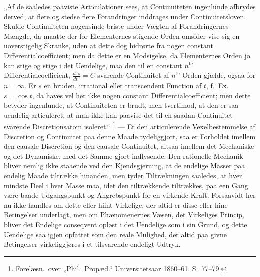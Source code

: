 \documentclass[12pt]{book}
\newcommand{\opage}[1]{\marginnote{\footnotesize\textit{[#1]}}}
\begin{document}
„Af de saaledes paaviste Articulationer sees, at Continuiteten ingenlunde afbrydes derved,
at flere og stedse flere Forandringer inddrages under Continuitetsloven. Skulde
Continuiteten nogensinde briste under Vægten af Forandringernes Mængde, da maatte der for
Elementernes stigende Orden omsider vise sig en uoverstigelig Skranke, uden at dette dog
hidrørte fra nogen constant Differentialcoefficient; men da dette er en Modsigelse, da
Elementernes Orden jo kan stige og stige i det Uendelige, maa den til en constant
$n^{\mathrm{te}}$ Differentialcoefficient, $\frac{d^{n}s}{dt^{n}} = C$ svarende Continuitet
af $n^{\mathrm{te}}$ Orden gjælde, ogsaa for $n = \infty$. Er $s$ en bruden, irrational
eller transcendent Function af $t$, f.\ Ex. $s = \cos t$, da haves vel her ikke nogen
constant Differentialcoefficient; men dette betyder ingenlunde, at Continuiteten er brudt,
men tvertimod, at den er saa uendelig articuleret, at man ikke kan paavise det til en saadan
Continuitet svarende Discretionsatom isoleret.“%
\footnote{Forelæsn.\ over „Phil.\ Propæd.“ Universitetsaar 1860--61. S.~77--79.}
--- Er den articulerende Vexelbestemmelse af Discretion og Continuitet paa denne Maade
tydeliggjort, saa er Forholdet imellem den causale Discretion og den causale Continuitet,
altsaa imellem det Mechaniske og det Dynamiske,
\opage{364} med det Samme gjort indlysende. Den rationelle Mechanik bliver nemlig ikke staaende ved den
Kjendsgjerning, at de endelige Masser paa endelig Maade tiltrække hinanden, men tyder
Tiltrækningen saaledes, at hver mindste Deel i hver Masse maa, idet den tiltrækkende
tiltrækkes, paa een Gang være baade Udgangspunkt og Angrebspunkt for en virkende Kraft.
Forsaavidt her nu ikke handles om dette eller hiint Virkelige, der altid er disse eller hine
Betingelser underlagt, men om Phænomenernes Væsen, det Virkeliges Princip, bliver det
Endelige conseqvent opløst i det Uendelige som i sin Grund, og dette Uendelige saa igjen
opfattet som den reale Mulighed, der altid paa givne Betingelser virkeliggjøres i et
tilsvarende endeligt Udtryk.
\end{document}
